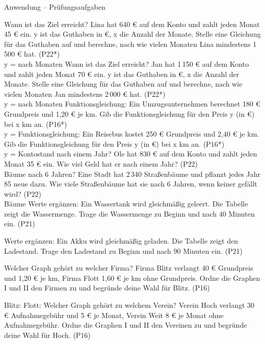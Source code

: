 \begin{aufgabe}{Anwendung – Prüfungsaufgaben}
\begin{teile}
\steil Wann ist das Ziel erreicht? Lina hat 640 € auf dem Konto und zahlt jeden Monat 45 € ein. y ist das Guthaben in €, x die Anzahl der Monate. Stelle eine Gleichung für das Guthaben auf und berechne, nach wie vielen Monaten Lina mindestens 1\,500 € hat. \hfill (P22*) \\ y = \leerfeld \quad nach \leerfeld Monaten
\steil Wann ist das Ziel erreicht? Jan hat 1\,150 € auf dem Konto und zahlt jeden Monat 70 € ein. y ist das Guthaben in €, x die Anzahl der Monate. Stelle eine Gleichung für das Guthaben auf und berechne, nach wie vielen Monaten Jan mindestens 2\,000 € hat. \hfill (P22*) \\ y = \leerfeld \quad nach \leerfeld Monaten
\steil Funktionsgleichung: Ein Umzugsunternehmen berechnet 180 € Grundpreis und 1{,}20 € je km. Gib die Funktionsgleichung für den Preis y (in €) bei x km an. \hfill (P16*) \\ y = \leerfeld
\steil Funktionsgleichung: Ein Reisebus kostet 250 € Grundpreis und 2{,}40 € je km. Gib die Funktionsgleichung für den Preis y (in €) bei x km an. \hfill (P16*) \\ y = \leerfeld
\teil Kontostand nach einem Jahr? Ole hat 830 € auf dem Konto und zahlt jeden Monat 35 € ein. Wie viel Geld hat er nach einem Jahr? \hfill (P22) \\ \leerfeld[€]
\teil Bäume nach 6 Jahren? Eine Stadt hat 2\,340 Straßenbäume und pflanzt jedes Jahr 85 neue dazu. Wie viele Straßenbäume hat sie nach 6 Jahren, wenn keiner gefällt wird? \hfill (P22) \\ \leerfeld Bäume
\teil Werte ergänzen: Ein Wassertank wird gleichmäßig geleert. Die Tabelle zeigt die Wassermenge. Trage die Wassermenge zu Beginn und nach 40 Minuten ein. \hfill (P21)

\teil Werte ergänzen: Ein Akku wird gleichmäßig geladen. Die Tabelle zeigt den Ladestand. Trage den Ladestand zu Beginn und nach 90 Minuten ein. \hfill (P21)

\teil Welcher Graph gehört zu welcher Firma? Firma Blitz verlangt 40 € Grundpreis und 1{,}20 € je km, Firma Flott 1{,}60 € je km ohne Grundpreis. Ordne die Graphen I und II den Firmen zu und begründe deine Wahl für Blitz. \hfill (P16) \\

\begin{ksys}[xmin=0,xmax=150,ymin=0,ymax=250,xstep=25,ystep=50,xlabel=x in km,ylabel=y in €,ablesen]   \end{ksys}
Blitz: \leerfeld \quad Flott: \leerfeld
\teil Welcher Graph gehört zu welchem Verein? Verein Hoch verlangt 30 € Aufnahmegebühr und 5 € je Monat, Verein Weit 8 € je Monat ohne Aufnahmegebühr. Ordne die Graphen I und II den Vereinen zu und begründe deine Wahl für Hoch. \hfill (P16) \\


\end{teile}
\end{aufgabe}
